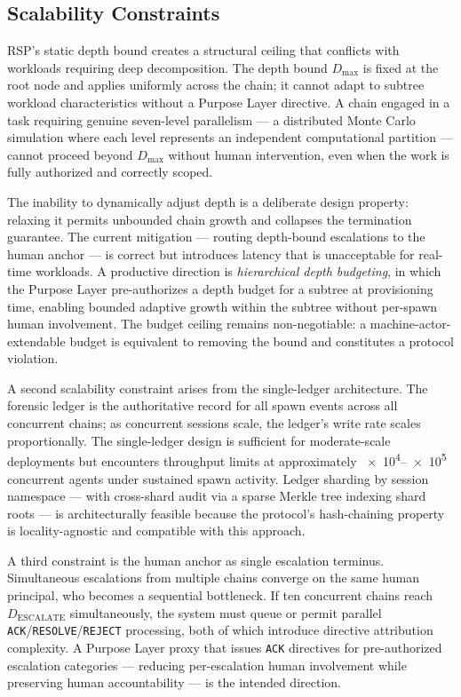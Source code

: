 \subsection{Scalability Constraints}
\label{sec:rs-scalability}

RSP's static depth bound creates a structural ceiling that conflicts with workloads requiring deep decomposition. The depth bound $D_{\max}$ is fixed at the root node and applies uniformly across the chain; it cannot adapt to subtree workload characteristics without a Purpose Layer directive. A chain engaged in a task requiring genuine seven-level parallelism — a distributed Monte Carlo simulation where each level represents an independent computational partition — cannot proceed beyond $D_{\max}$ without human intervention, even when the work is fully authorized and correctly scoped.

The inability to dynamically adjust depth is a deliberate design property: relaxing it permits unbounded chain growth and collapses the termination guarantee. The current mitigation — routing depth-bound escalations to the human anchor — is correct but introduces latency that is unacceptable for real-time workloads. A productive direction is \emph{hierarchical depth budgeting}, in which the Purpose Layer pre-authorizes a depth budget for a subtree at provisioning time, enabling bounded adaptive growth within the subtree without per-spawn human involvement. The budget ceiling remains non-negotiable: a machine-actor-extendable budget is equivalent to removing the bound and constitutes a protocol violation.

A second scalability constraint arises from the single-ledger architecture. The forensic ledger is the authoritative record for all spawn events across all concurrent chains; as concurrent sessions scale, the ledger's write rate scales proportionally. The single-ledger design is sufficient for moderate-scale deployments but encounters throughput limits at approximately \numrange{e4}{e5} concurrent agents under sustained spawn activity. Ledger sharding by session namespace — with cross-shard audit via a sparse Merkle tree indexing shard roots — is architecturally feasible because the protocol's hash-chaining property is locality-agnostic and compatible with this approach.

A third constraint is the human anchor as single escalation terminus. Simultaneous escalations from multiple chains converge on the same human principal, who becomes a sequential bottleneck. If ten concurrent chains reach $D_{\text{ESCALATE}}$ simultaneously, the system must queue or permit parallel \texttt{ACK}/\texttt{RESOLVE}/\texttt{REJECT} processing, both of which introduce directive attribution complexity. A Purpose Layer proxy that issues \texttt{ACK} directives for pre-authorized escalation categories — reducing per-escalation human involvement while preserving human accountability — is the intended direction.

